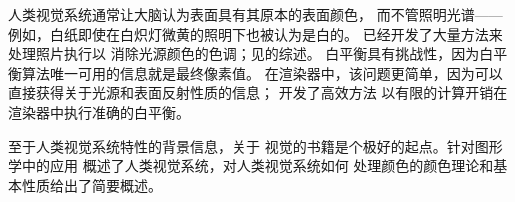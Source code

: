 人类视觉系统通常让大脑认为表面具有其原本的表面颜色，
而不管照明光谱——例如，白纸即使在白炽灯微黄的照明下也被认为是白的。
已经开发了大量方法来处理照片执行以
消除光源颜色的色调；见\citet{5719167}的综述。
白平衡具有挑战性，因为白平衡算法唯一可用的信息就是最终像素值。
在渲染器中，该问题更简单，因为可以直接获得关于光源和表面反射性质的信息；
\citet{10.1111/j.1467-8659.2009.01487.x}开发了高效方法
以有限的计算开销在渲染器中执行准确的白平衡。

至于人类视觉系统特性的背景信息，\citet{wandell1995foundations}关于
视觉的书籍是个极好的起点。\citet{946628}针对图形学中的应用
概述了人类视觉系统，\citet{Malacara2011Color}对人类视觉系统如何
处理颜色的颜色理论和基本性质给出了简要概述。